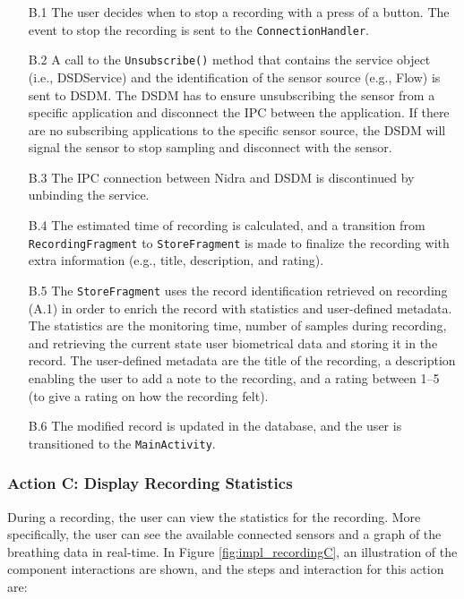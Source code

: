 \begin{itemize}
    \item[B.1] The user decides when to stop a recording with a press of a button. The event to stop the recording is sent to the \verb|ConnectionHandler|.
    \item[B.2] A call to the \verb|Unsubscribe()| method that contains the service object (i.e., DSDService) and the identification of the sensor source (e.g., Flow) is sent to DSDM. The DSDM has to ensure unsubscribing the sensor from a specific application and disconnect the IPC between the application. If there are no subscribing applications to the specific sensor source, the DSDM will signal the sensor to stop sampling and disconnect with the sensor. 
    \item[B.3] The IPC connection between Nidra and DSDM is discontinued by unbinding the service. 
    \item[B.4] The estimated time of recording is calculated, and a transition from \verb|RecordingFragment| to \verb|StoreFragment| is made to finalize the recording with extra information (e.g., title, description, and rating). 
    \item[B.5] The \verb|StoreFragment| uses the record identification retrieved on recording (A.1) in order to enrich the record with statistics and user-defined metadata. The statistics are the monitoring time, number of samples during recording, and retrieving the current state user biometrical data and storing it in the record. The user-defined metadata are the title of the recording, a description enabling the user to add a note to the recording, and a rating between 1--5 (to give a rating on how the recording felt). 
    \item[B.6] The modified record is updated in the database, and the user is transitioned to the \verb|MainActivity|.
\end{itemize}

\subsubsection{Action C: Display Recording Statistics}
During a recording, the user can view the statistics for the recording. More specifically, the user can see the available connected sensors and a graph of the breathing data in real-time. In Figure \ref{fig:impl_recordingC}, an illustration of the component interactions are shown, and the steps and interaction for this action are: 

